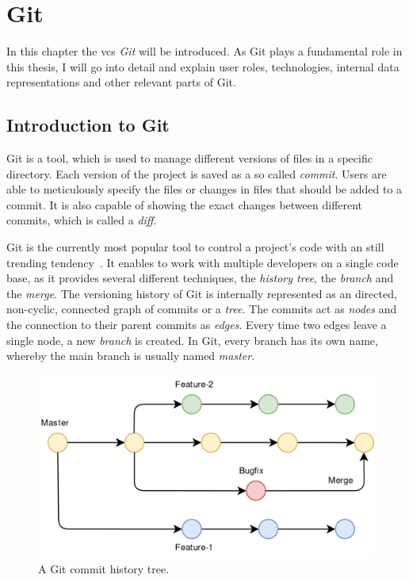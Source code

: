 \section{Git}\label{git-explanation}
In this chapter the \ac{vcs} \emph{Git} will be introduced.
As Git plays a fundamental role in this thesis, I will go into detail and explain user roles, technologies, internal data representations and other relevant parts of Git.


\subsection{Introduction to Git}\label{git-introduction}
Git is a tool, which is used to manage different versions of files in a specific directory.
Each version of the project is saved as a so called \emph{commit}.
Users are able to meticulously specify the files or changes in files that should be added to a commit.
It is also capable of showing the exact changes between different commits, which is called a \emph{diff}.

Git is the currently most popular tool to control a project's code with an still trending tendency~\cite{article:git-popularity}.
It enables to work with multiple developers on a single code base, as it provides several different techniques, the \emph{history tree}, the \emph{branch} and the \emph{merge}.
The versioning history of Git is internally represented as an directed, non-cyclic, connected graph of commits or a \emph{tree}.
The commits act as \emph{nodes} and the connection to their parent commits as \emph{edges}.
Every time two edges leave a single node, a new \emph{branch} is created.
In Git, every branch has its own name, whereby the main branch is usually named \emph{master}.

\begin{figure}[H]
    \includegraphics[scale=0.35]{./graphs/git-history-branch}
    \centering
    \caption{A Git commit history tree.}\label{fig:git-commit-tree}
\end{figure}


